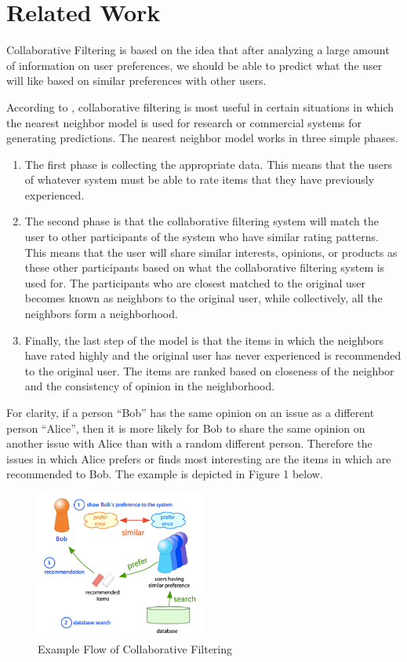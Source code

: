 \documentclass[conference]{IEEEtran}
\begin{document}
\section{Related Work}

Collaborative Filtering is based on the idea that after analyzing a large amount of information on user preferences, we should be able to predict what the user will like based on similar preferences with other users.

According to \cite{ClusteringItems}, collaborative filtering is most useful in certain situations in which the nearest neighbor model is used for research or commercial systems for generating predictions.  The nearest neighbor model works in three simple phases.  

\begin{enumerate}
  \item The first phase is collecting the appropriate data. This means that the users of whatever system must be able to rate
        items that they have previously experienced. 
  \item The second phase is that the collaborative filtering system will match the user to other participants of the system who
        have similar rating patterns.  This means that the user will share similar interests, opinions, or products as these 
        other participants based on what the collaborative filtering system is used for.  The participants who are closest 
        matched to the original user becomes known as neighbors to the original user, while collectively, all the neighbors 
        form a neighborhood.
  \item Finally, the last step of the model is that the items in which the neighbors have rated highly and the original user has
        never experienced is recommended to the original user.  The items are ranked based on closeness of the neighbor and the 
        consistency of opinion in the neighborhood.
\end{enumerate}

For clarity, if a person “Bob” has the same opinion on an issue as a different person “Alice”, then it is more likely for Bob to share the same opinion on another issue with Alice than with a random different person.  Therefore the issues in which Alice prefers or finds most interesting are the items in which are recommended to Bob.  The example is depicted in Figure 1 below.

\begin{figure}[h]
\centering
\includegraphics[width=0.5\textwidth]{image/cf_example_flow}
\caption{Example Flow of Collaborative Filtering}
\end{figure}
\end{document}
